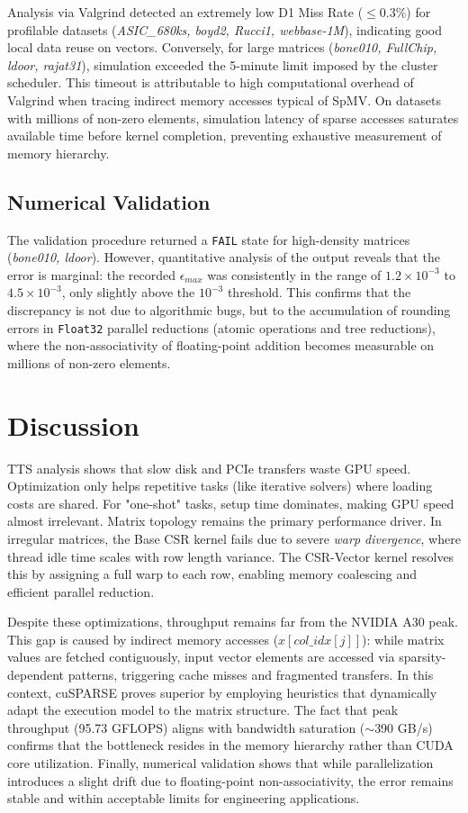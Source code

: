 \documentclass[conference]{IEEEtran}
\begin{document}
Analysis via Valgrind detected an extremely low D1 Miss Rate ($\leq 0.3\%$) for profilable datasets (\textit{ASIC\_680ks, boyd2, Rucci1, webbase-1M}), indicating good local data reuse on vectors. Conversely, for large matrices (\textit{bone010, FullChip, ldoor, rajat31}), simulation exceeded the 5-minute limit imposed by the cluster scheduler. This timeout is attributable to high computational overhead of Valgrind when tracing indirect memory accesses typical of SpMV. On datasets with millions of non-zero elements, simulation latency of sparse accesses saturates available time before kernel completion, preventing exhaustive measurement of memory hierarchy.


\subsection{Numerical Validation}

The validation procedure returned a \texttt{FAIL} state for high-density matrices (\textit{bone010, ldoor}). However, quantitative analysis of the output reveals that the error is marginal: the recorded $\epsilon_{max}$ was consistently in the range of $1.2 \times 10^{-3}$ to $4.5 \times 10^{-3}$, only slightly above the $10^{-3}$ threshold. This confirms that the discrepancy is not due to algorithmic bugs, but to the accumulation of rounding errors in \texttt{Float32} parallel reductions (atomic operations and tree reductions), where the non-associativity of floating-point addition becomes measurable on millions of non-zero elements.
\section{Discussion}
TTS analysis shows that slow disk and PCIe transfers waste GPU speed. Optimization only helps repetitive tasks (like iterative solvers) where loading costs are shared. For "one-shot" tasks, setup time dominates, making GPU speed almost irrelevant.
Matrix topology remains the primary performance driver. In irregular matrices, the Base CSR kernel fails due to severe \textit{warp divergence}, where thread idle time scales with row length variance. The CSR-Vector kernel resolves this by assigning a full warp to each row, enabling memory coalescing and efficient parallel reduction. 

Despite these optimizations, throughput remains far from the NVIDIA A30 peak. This gap is caused by indirect memory accesses ($x[col\_idx[j]]$): while matrix values are fetched contiguously, input vector elements are accessed via sparsity-dependent patterns, triggering cache misses and fragmented transfers. In this context, cuSPARSE proves superior by employing heuristics that dynamically adapt the execution model to the matrix structure. The fact that peak throughput (95.73 GFLOPS) aligns with bandwidth saturation ($\sim$390 GB/s) confirms that the bottleneck resides in the memory hierarchy rather than CUDA core utilization. Finally, numerical validation shows that while parallelization introduces a slight drift due to floating-point non-associativity, the error remains stable and within acceptable limits for engineering applications.
\end{document}
